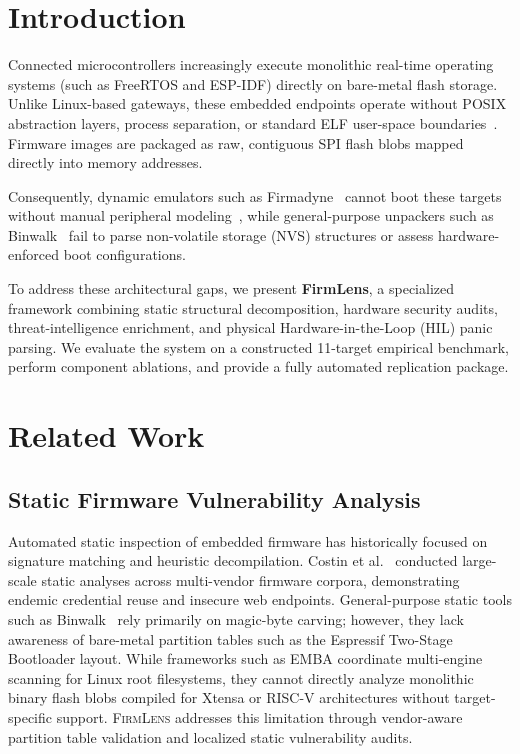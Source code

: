 \documentclass[conference]{IEEEtran}
\begin{document}
\section{Introduction}

Connected microcontrollers increasingly execute monolithic real-time operating systems (such as FreeRTOS and ESP-IDF) directly on bare-metal flash storage. Unlike Linux-based gateways, these embedded endpoints operate without POSIX abstraction layers, process separation, or standard ELF user-space boundaries~\cite{costin2014large}. Firmware images are packaged as raw, contiguous SPI flash blobs mapped directly into memory addresses.

Consequently, dynamic emulators such as Firmadyne~\cite{firmadyne2016} cannot boot these targets without manual peripheral modeling~\cite{feng2021p2im}, while general-purpose unpackers such as Binwalk~\cite{binwalk2014} fail to parse non-volatile storage (NVS) structures or assess hardware-enforced boot configurations.

To address these architectural gaps, we present \textbf{FirmLens}, a specialized framework combining static structural decomposition, hardware security audits, threat-intelligence enrichment, and physical Hardware-in-the-Loop (HIL) panic parsing. We evaluate the system on a constructed 11-target empirical benchmark, perform component ablations, and provide a fully automated replication package.

\section{Related Work}
\label{sec:related_work}

\subsection{Static Firmware Vulnerability Analysis}

Automated static inspection of embedded firmware has historically focused on signature matching and heuristic decompilation. Costin et al.~\cite{costin2014large} conducted large-scale static analyses across multi-vendor firmware corpora, demonstrating endemic credential reuse and insecure web endpoints. General-purpose static tools such as Binwalk~\cite{binwalk2014} rely primarily on magic-byte carving; however, they lack awareness of bare-metal partition tables such as the Espressif Two-Stage Bootloader layout. While frameworks such as EMBA coordinate multi-engine scanning for Linux root filesystems, they cannot directly analyze monolithic binary flash blobs compiled for Xtensa or RISC-V architectures without target-specific support. \textsc{FirmLens} addresses this limitation through vendor-aware partition table validation and localized static vulnerability audits.
\end{document}
